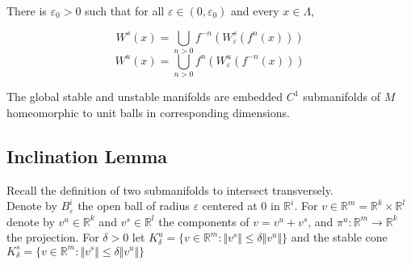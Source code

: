 \begin{prop}

There is $\varepsilon_0 > 0$ such that for all $\varepsilon \in (0, \varepsilon_0)$ and every $x \in \Lambda$,

\[W^s(x) = \bigcup_{n > 0} f^{-n}(W^s_{\varepsilon}(f^n(x)))\]
\[W^u(x) = \bigcup_{n > 0}f^n(W^u_{\varepsilon}(f^{-n}(x)))\]

\end{prop}

\begin{cor}

The global stable and unstable manifolds are embedded $C^1$ submanifolds of $M$ homeomorphic to unit balls in corresponding dimensions.

\end{cor}


\subsection{Inclination Lemma}

\indent Recall the definition of two submanifolds to intersect transversely. \\
\indent Denote by $B^i_{\varepsilon}$ the open ball of radius $\varepsilon$ centered at 0 in $\mathbb{R}^i$. For $v \in \mathbb{R}^m=\mathbb{R}^k \times \mathbb{R}^l$ denote by $v^u \in \mathbb{R}^k$ and $v^s \in \mathbb{R}^l$ the components of $v = v^u + v^s$, and $\pi^u: \mathbb{R}^m \to \mathbb{R}^k$ the projection. For $\delta > 0$ let $K^u_{\delta} = \{ v \in \mathbb{R}^m: \Vert v^s \Vert \leq \delta \Vert v^u \Vert \}$ and the stable cone $K^s_{\delta} = \{ v \in \mathbb{R}^m: \Vert v^s \Vert \leq \delta \Vert v^u \Vert \} $

